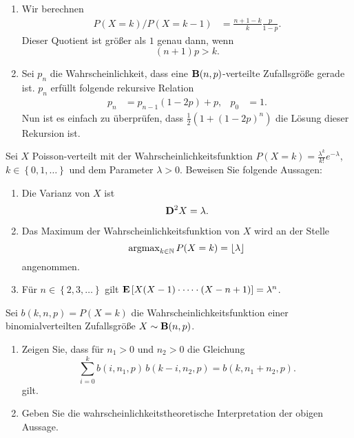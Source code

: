 \solution 
\begin{enumerate}
    \item Wir berechnen
        \begin{align*}
            P(X=k)/P(X=k-1) &= \frac{n+1-k}{k} \frac{p}{1-p}.
        \end{align*}
        Dieser Quotient ist größer als $1$ genau dann, wenn 
        \begin{equation*}
            (n+1)p > k. 
        \end{equation*}
    \item Sei $p_n$ die Wahrscheinlichkeit, dass eine
        $\mathbf B(n,p)$-verteilte Zufallsgröße gerade ist. $p_n$ erfüllt folgende rekursive
        Relation
        \begin{align*}
            p_n &= p_{n-1}(1-2p) + p, &  p_0 &= 1.
        \end{align*}
        Nun ist es einfach zu überprüfen, dass $\frac{1}{2}(1+ (1-2p)^n)$ die Lösung
        dieser Rekursion ist. 
\end{enumerate}


 Sei $X$
Poisson-verteilt mit der Wahrscheinlichkeitsfunktion $P(X = k) =
\frac{\lambda^k}{k!} e^{-\lambda}$, $k\in \left\{ 0,1,\dots \right\}$ und dem
Parameter $\lambda>0$. Beweisen Sie folgende Aussagen: 
\begin{enumerate}
    \item Die Varianz von $X$ ist 
        \begin{equation*}
            \mathbf D^2 X = \lambda.
        \end{equation*}
    \item  Das Maximum der Wahrscheinlichkeitsfunktion von $X$ wird an der Stelle
        \begin{equation*}
            \operatorname{argmax}_{k\in \mathbb N} P(X= k) = \lfloor \lambda \rfloor 
        \end{equation*}
        angenommen.

    \item Für $n\in \left\{ 2,3,\dots  \right\}$ gilt 
        $\mathbf E \left[ X(X-1)\cdot\dots\cdot (X-n+1) \right] = \lambda^n$.
\end{enumerate}

\solution


Sei $b(k, n, p)=P(X=k)$ die Wahrscheinlichkeitsfunktion einer binomialverteilten
Zufallsgröße $X\sim\mathbf B(n,p)$.
\begin{enumerate}
    \item Zeigen Sie, dass für $n_1>0$ und $n_2>0$ die Gleichung
        \begin{equation*}
            \sum_{i=0}^{k} b(i, n_1, p)\, b( k-i, n_2, p) = b( k, n_1+n_2, p ).
        \end{equation*}
        gilt. 

    \item Geben Sie die wahrscheinlichkeitstheoretische Interpretation der
        obigen Aussage.
\end{enumerate}


